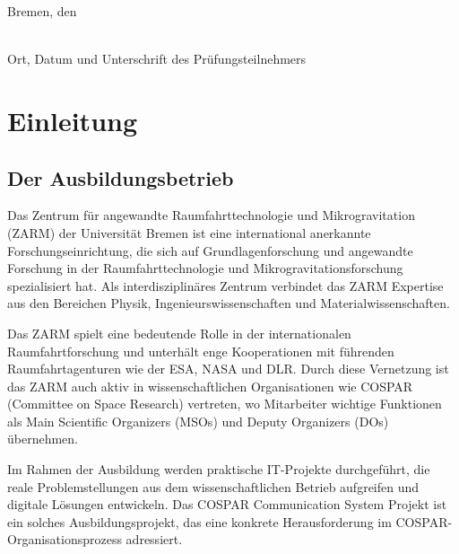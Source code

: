 \documentclass[11pt,a4paper]{article}
\begin{document}
\vspace{3cm}

\noindent
Bremen, den \underline{\hspace{3cm}}

\vspace{2cm}

\noindent
\underline{\hspace{8cm}}\\
Ort, Datum und Unterschrift des Prüfungsteilnehmers

\newpage

\setcounter{page}{1}
\tableofcontents
\newpage

\thispagestyle{empty}
\listoffigures

\clearpage
{}
\setcounter{page}{1}
\section{Einleitung}

\subsection{Der Ausbildungsbetrieb}
Das Zentrum für angewandte Raumfahrttechnologie und Mikrogravitation (ZARM) der Universität Bremen ist eine international anerkannte Forschungseinrichtung, die sich auf Grundlagenforschung und angewandte Forschung in der Raumfahrttechnologie und Mikrogravitationsforschung spezialisiert hat. Als interdisziplinäres Zentrum verbindet das ZARM Expertise aus den Bereichen Physik, Ingenieurswissenschaften und Materialwissenschaften.

Das ZARM spielt eine bedeutende Rolle in der internationalen Raumfahrtforschung und unterhält enge Kooperationen mit führenden Raumfahrtagenturen wie der ESA, NASA und DLR. Durch diese Vernetzung ist das ZARM auch aktiv in wissenschaftlichen Organisationen wie COSPAR (Committee on Space Research) vertreten, wo Mitarbeiter wichtige Funktionen als Main Scientific Organizers (MSOs) und Deputy Organizers (DOs) übernehmen.

Im Rahmen der Ausbildung werden praktische IT-Projekte durchgeführt, die reale Problemstellungen aus dem wissenschaftlichen Betrieb aufgreifen und digitale Lösungen entwickeln. Das COSPAR Communication System Projekt ist ein solches Ausbildungsprojekt, das eine konkrete Herausforderung im COSPAR-Organisationsprozess adressiert.
\end{document}
